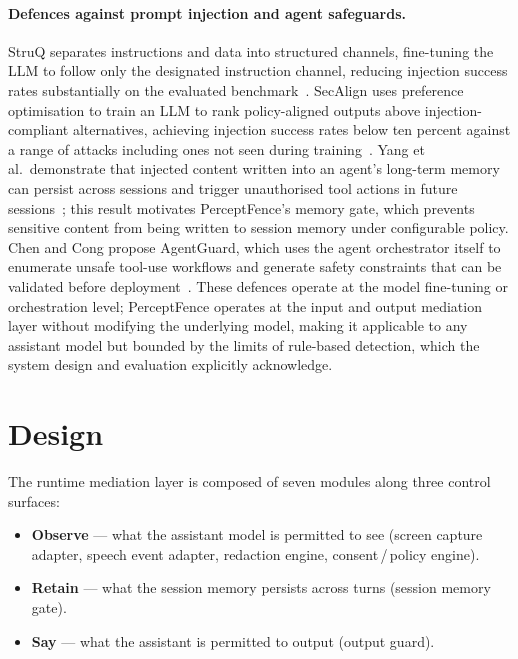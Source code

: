 \documentclass[sn-mathphys-num]{sn-jnl}
\begin{document}
\paragraph{Defences against prompt injection and agent safeguards.}
StruQ separates instructions and data into structured channels, fine-tuning the
LLM to follow only the designated instruction channel, reducing injection
success rates substantially on the evaluated benchmark~\cite{chen2025struq}.
SecAlign uses preference optimisation to train an LLM to rank policy-aligned
outputs above injection-compliant alternatives, achieving injection success
rates below ten percent against a range of attacks including ones not seen
during training~\cite{chen2025secalign}.
Yang et al.\ demonstrate that injected content written into an agent's
long-term memory can persist across sessions and trigger unauthorised tool
actions in future sessions~\cite{yang2026zombie}; this result motivates
PerceptFence's memory gate, which prevents sensitive content from being
written to session memory under configurable policy.
Chen and Cong propose AgentGuard, which uses the agent orchestrator itself to
enumerate unsafe tool-use workflows and generate safety constraints that can
be validated before deployment~\cite{chen2025agentguard}.
These defences operate at the model fine-tuning or orchestration level;
PerceptFence operates at the input and output mediation layer without modifying
the underlying model, making it applicable to any assistant model but bounded
by the limits of rule-based detection, which the system design and evaluation
explicitly acknowledge.

\section{Design}\label{sec:design}

The runtime mediation layer is composed of seven modules along three control
surfaces:

\begin{itemize}
  \item \textbf{Observe} --- what the assistant model is permitted to see
        (screen capture adapter, speech event adapter, redaction engine,
        consent\,/\,policy engine).
  \item \textbf{Retain} --- what the session memory persists across turns
        (session memory gate).
  \item \textbf{Say} --- what the assistant is permitted to output
        (output guard).
\end{itemize}
\end{document}

